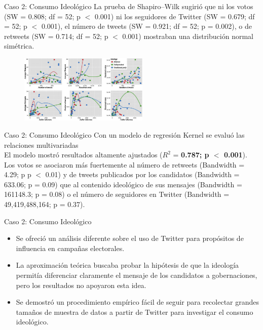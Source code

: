\documentclass{beamer}
\begin{document}
\begin{frame}{Caso 2: Consumo Ideológico}
La prueba de Shapiro–Wilk sugirió que ni los votos (SW = 0.808; df = 52; p $<$ 0.001) ni los seguidores de Twitter (SW = 0.679; df = 52; p $<$ 0.001), el número de tweets (SW = 0.921; df = 52; p = 0.002), o de retweets (SW = 0.714; df = 52; p $<$ 0.001) mostraban una distribución normal simétrica.
\begin{figure}
\centering
\includegraphics[width=0.55\textwidth]{f3}
\end{figure}
\end{frame}

\begin{frame}{Caso 2: Consumo Ideológico}
Con un modelo de regresión Kernel \cite{Hayfield2008} se evaluó las relaciones multivariadas\\
\vspace{0.5cm}
El modelo mostró resultados altamente ajustados ($R^2$ = \textbf{0.787; p $<$ 0.001}). Los votos se asociaron más fuertemente al número de retweets (Bandwidth = 4.29; p p $<$ 0.01) y de tweets publicados por los candidatos (Bandwidth = 633.06; p = 0.09) que al contenido ideológico de sus mensajes (Bandwidth = 161148.3; p = 0.08) o el número de seguidores en Twitter (Bandwidth = 49,419,488,164; p = 0.37).
\end{frame}

\begin{frame}{Caso 2: Consumo Ideológico}
\begin{itemize}
    \item[1] Se ofreció un análisis diferente sobre el uso de Twitter para propósitos de influencia en campañas electorales.
    \pause
    \vspace{0.5cm}
    \item[2] La aproximación teórica buscaba probar la hipótesis de que la ideología permitía diferenciar claramente el mensaje de los candidatos a gobernaciones, pero los resultados no apoyaron esta idea.
    \pause
    \vspace{0.5cm}
    \item[3] Se demostró un procedimiento empírico fácil de seguir para recolectar grandes tamaños de muestra de datos a partir de Twitter para investigar el consumo ideológico.
\end{itemize}
\end{frame}
\end{document}
